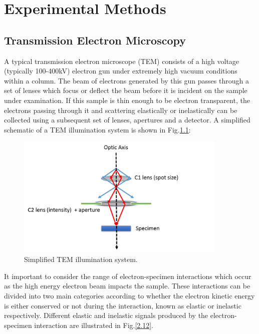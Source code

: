 
\chapter{Experimental Methods}

\section{Transmission Electron Microscopy}
\label{TEM}
A typical transmission electron microscope   (TEM) consists of a high voltage (typically 100-400kV) electron gun under extremely high vacuum conditions within a column. The beam of electrons generated by this gun passes through a set of lenses which focus or deflect the beam before it is incident on the sample under examination. If this sample is thin enough to be electron transparent, the electrons passing through it and scattering elastically or inelastically can be collected using a subsequent set of lenses, apertures and a detector. A simplified schematic of a TEM illumination system is shown in Fig.\ref{2.11}:

\begin{figure}[!ht]
	\centering
	\includegraphics[width=0.9\textwidth]{Figs/Ch2/illum.png}
	\caption[h] {Simplified TEM illumination system.}
	\label{2.11}
\end{figure}

\FloatBarrier 

It important to consider the range of electron-specimen interactions which occur as the high energy electron beam impacts the sample. These interactions can be divided into two main categories according to whether the electron kinetic energy is either conserved or not during the interaction, known as elastic or inelastic respectively. Different elastic and inelastic signals produced by the electron-specimen interaction are illustrated in Fig.\ref{2.12}.

